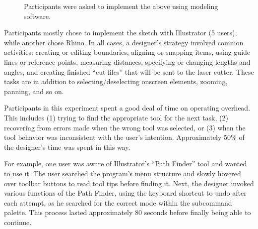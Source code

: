 \documentclass{article}
\begin{document}
\begin{figure}[h]
\centering 
{}

\caption{Participants were asked to implement the above using modeling
  software.}
\label{fig:interview-sketch}
\end{figure}

Participants mostly chose to implement the sketch with Illustrator (5
users), while another chose Rhino. In all cases, a designer's strategy
involved common activities: creating or editing boundaries, aligning
or snapping items, using guide lines or reference points, measuring
distances, specifying or changing lengths and angles, and creating
finished ``cut files'' that will be sent to the laser cutter. These
tasks are in addition to selecting/deselecting onscreen elements,
zooming, panning, and so on.

Participants in this experiment spent a good deal of time on operating
overhead. This includes (1) trying to find the appropriate tool for
the next task, (2) recovering from errors made when the wrong tool was
selected, or (3) when the tool behavior was inconsistent with the
user's intention. Approximately 50\% of the designer's time was spent
in this way.

For example, one user was aware of Illustrator's ``Path Finder'' tool
and wanted to use it. The user searched the program's menu structure
and slowly hovered over toolbar buttons to read tool tips before
finding it. Next, the designer invoked various functions of the Path
Finder, using the keyboard shortcut to undo after each attempt, as he
searched for the correct mode within the subcommand palette. This
process lasted approximately 80 seconds before finally being able to
continue.
\end{document}
